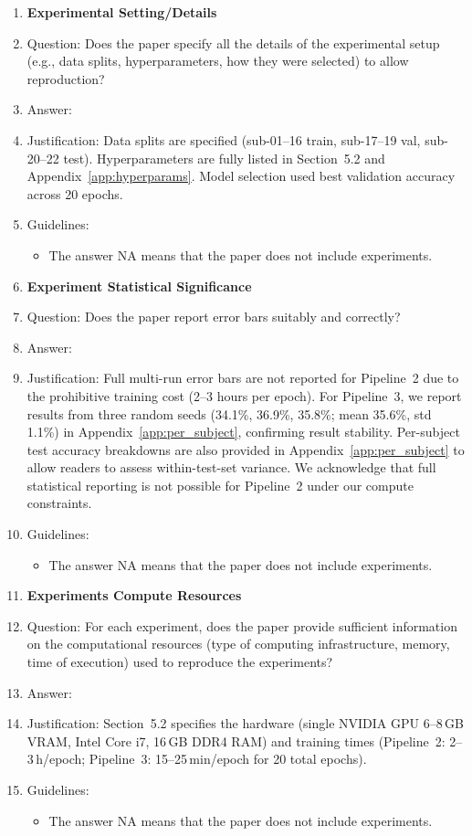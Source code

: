 \documentclass{article}
\begin{document}
\begin{enumerate}
\item {\bf Experimental Setting/Details}
    \item[] Question: Does the paper specify all the details of the experimental setup (e.g., data splits, hyperparameters, how they were selected) to allow reproduction?
    \item[] Answer: \answerYes{}
    \item[] Justification: Data splits are specified (sub-01--16 train, sub-17--19 val, sub-20--22 test). Hyperparameters are fully listed in Section~5.2 and Appendix~\ref{app:hyperparams}. Model selection used best validation accuracy across 20 epochs.
    \item[] Guidelines:
    \begin{itemize}
        \item The answer NA means that the paper does not include experiments.
    \end{itemize}

\item {\bf Experiment Statistical Significance}
    \item[] Question: Does the paper report error bars suitably and correctly?
    \item[] Answer: \answerNo{}
    \item[] Justification: Full multi-run error bars are not reported for Pipeline~2 due to the prohibitive training cost (2--3 hours per epoch). For Pipeline~3, we report results from three random seeds (34.1\%, 36.9\%, 35.8\%; mean 35.6\%, std 1.1\%) in Appendix~\ref{app:per_subject}, confirming result stability. Per-subject test accuracy breakdowns are also provided in Appendix~\ref{app:per_subject} to allow readers to assess within-test-set variance. We acknowledge that full statistical reporting is not possible for Pipeline~2 under our compute constraints.
    \item[] Guidelines:
    \begin{itemize}
        \item The answer NA means that the paper does not include experiments.
    \end{itemize}

\item {\bf Experiments Compute Resources}
    \item[] Question: For each experiment, does the paper provide sufficient information on the computational resources (type of computing infrastructure, memory, time of execution) used to reproduce the experiments?
    \item[] Answer: \answerYes{}
    \item[] Justification: Section~5.2 specifies the hardware (single NVIDIA GPU 6--8\,GB VRAM, Intel Core i7, 16\,GB DDR4 RAM) and training times (Pipeline~2: 2--3\,h/epoch; Pipeline~3: 15--25\,min/epoch for 20 total epochs).
    \item[] Guidelines:
    \begin{itemize}
        \item The answer NA means that the paper does not include experiments.
    \end{itemize}


\end{enumerate}
\end{document}
